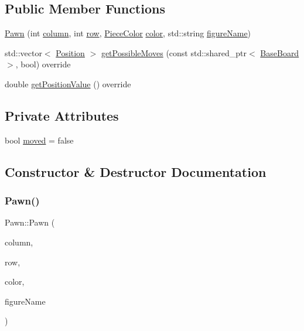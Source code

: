 \subsection*{Public Member Functions}
\begin{DoxyCompactItemize}
\item 
\hyperlink{class_pawn_aaf6f86ddb27b18e111cf2e2d7e65f844}{Pawn} (int \hyperlink{class_piece_aa8f39e11280395103164f6ae07398c82}{column}, int \hyperlink{class_piece_ac6ef7c474f20562cb629c2452ce0631d}{row}, \hyperlink{_piece_8h_ad7595c48bb74c0dd2a7648712a2d4985}{Piece\+Color} \hyperlink{class_piece_a8dfe0501fe95a1a7618cf5ad3b9fda69}{color}, std\+::string \hyperlink{class_piece_af2fe809fd0d35d167f2419768e49fd3a}{figure\+Name})
\item 
std\+::vector$<$ \hyperlink{struct_position}{Position} $>$ \hyperlink{class_pawn_a54eddd8724008c910f34c5c49374d5c5}{get\+Possible\+Moves} (const std\+::shared\+\_\+ptr$<$ \hyperlink{class_base_board}{Base\+Board} $>$, bool) override
\item 
double \hyperlink{class_pawn_a332e70ab65f480521428aa87c7cd2ef9}{get\+Position\+Value} () override
\end{DoxyCompactItemize}
\subsection*{Private Attributes}
\begin{DoxyCompactItemize}
\item 
bool \hyperlink{class_pawn_aac8df37fd58c41fe91460325e5447464}{moved} = false
\end{DoxyCompactItemize}


\subsection{Constructor \& Destructor Documentation}
\mbox{\label{class_pawn_aaf6f86ddb27b18e111cf2e2d7e65f844}} 
\subsubsection{\texorpdfstring{Pawn()}{Pawn()}}
{\footnotesize\ttfamily Pawn\+::\+Pawn (\begin{DoxyParamCaption}\item[{int}]{column,  }\item[{int}]{row,  }\item[{\hyperlink{_piece_8h_ad7595c48bb74c0dd2a7648712a2d4985}{Piece\+Color}}]{color,  }\item[{std\+::string}]{figure\+Name }\end{DoxyParamCaption})\hspace{0.3cm}{\ttfamily [inline]}}



